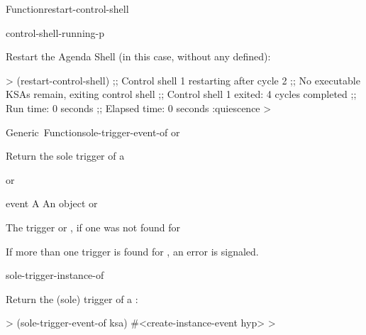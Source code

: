\documentclass[10pt,twoside,english,pdftex]{article}
\begin{document}
\begin{functiondoc}{Function}{restart-control-shell}{%
     
    \returns{} \superstar}
\fnerrors
\threadsnotstarted

\begin{alsos}{control-shell-running-p}
\end{alsos}

\fnexample
Restart the Agenda Shell (in this case, without any  defined):
%
\W\supp
\begin{example}
  > (restart-control-shell)
  ;; Control shell 1 restarting after cycle 2
  ;; No executable KSAs remain, exiting control shell
  ;; Control shell 1 exited: 4 cycles completed
  ;; Run time: 0 seconds
  ;; Elapsed time: 0 seconds
  :quiescence
  >
\end{example}

%
\fnnote \pollingnote

\end{functiondoc}


\begin{functiondoc}{Generic~Function}{sole-trigger-event-of}{ 
    \returns{}  or \nil}
%
%
%

\fnsyntax

\fnpurpose Return the sole trigger  of a 

\fnmethods
{}%
  {\code{(} 
  \returns{}  or \nil}

\fnpackage {}

\fnmodule {}

\fnargs
\begin{args}{event}
\arg[ksa] A 
\arg[event] An  object or \nil{}
\end{args}

\fnreturns The trigger  or \nil, if one was not found for
  
\fndescription If more than one trigger  is found for
, an error is signaled.

\begin{alsos}{sole-trigger-instance-of}
\end{alsos}

\fnexample
Return the (sole) trigger  of a :
%
\W\supp
\begin{example}
  > (sole-trigger-event-of ksa)
  #<create-instance-event hyp>
  >
\end{example}

\end{functiondoc}
\end{document}
